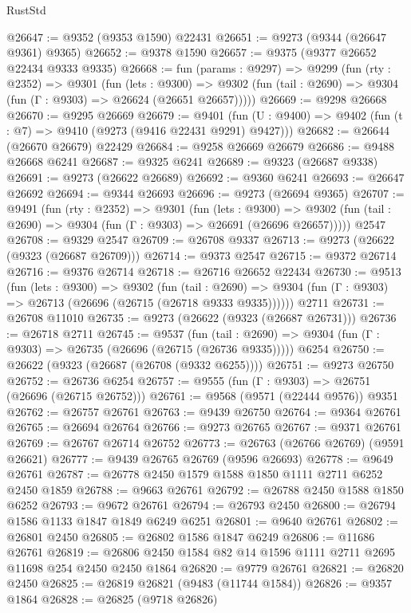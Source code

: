 \begin{lexlean}{RustStd}
\begin{coremodule}
{\begin{coremodule}
{{{{{{{{{{{{{{{{{{{{{{{{{{{{{{{{{{{{{{{{{{{{{{{{{{{{{{{@26647 := @9352 (@9353 @1590) @22431
@26651 := @9273 (@9344 (@26647 @9361) @9365)
@26652 := @9378 @1590
@26657 := @9375 (@9377 @26652 @22434 @9333 @9335)
@26668 := fun (params : @9297) =>
  @9299
    (fun (rty : @2352) =>
    @9301
      (fun (lets : @9300) =>
      @9302 (fun (tail : @2690) => @9304 (fun (Γ : @9303) => @26624 (@26651 @26657)))))
@26669 := @9298 @26668
@26670 := @9295 @26669
@26679 := @9401
    (fun (U : @9400) => @9402 (fun (t : @7) => @9410 (@9273 (@9416 @22431 @9291) @9427)))
@26682 := @26644 (@26670 @26679) @22429
@26684 := @9258 @26669 @26679
@26686 := @9488 @26668 @6241
@26687 := @9325 @6241
@26689 := @9323 (@26687 @9338)
@26691 := @9273 (@26622 @26689)
@26692 := @9360 @6241
@26693 := @26647 @26692
@26694 := @9344 @26693
@26696 := @9273 (@26694 @9365)
@26707 := @9491
    (fun (rty : @2352) =>
    @9301
      (fun (lets : @9300) =>
      @9302 (fun (tail : @2690) => @9304 (fun (Γ : @9303) => @26691 (@26696 @26657)))))
    @2547
@26708 := @9329 @2547
@26709 := @26708 @9337
@26713 := @9273 (@26622 (@9323 (@26687 @26709)))
@26714 := @9373 @2547
@26715 := @9372 @26714
@26716 := @9376 @26714
@26718 := @26716 @26652 @22434
@26730 := @9513
    (fun (lets : @9300) =>
    @9302
      (fun (tail : @2690) =>
      @9304 (fun (Γ : @9303) => @26713 (@26696 (@26715 (@26718 @9333 @9335))))))
    @2711
@26731 := @26708 @11010
@26735 := @9273 (@26622 (@9323 (@26687 @26731)))
@26736 := @26718 @2711
@26745 := @9537
    (fun (tail : @2690) => @9304 (fun (Γ : @9303) => @26735 (@26696 (@26715 (@26736 @9335)))))
    @6254
@26750 := @26622 (@9323 (@26687 (@26708 (@9332 @6255))))
@26751 := @9273 @26750
@26752 := @26736 @6254
@26757 := @9555 (fun (Γ : @9303) => @26751 (@26696 (@26715 @26752)))
@26761 := @9568 (@9571 (@22444 @9576)) @9351
@26762 := @26757 @26761
@26763 := @9439 @26750
@26764 := @9364 @26761
@26765 := @26694 @26764
@26766 := @9273 @26765
@26767 := @9371 @26761
@26769 := @26767 @26714 @26752
@26773 := @26763 (@26766 @26769) (@9591 @26621)
@26777 := @9439 @26765 @26769 (@9596 @26693)
@26778 := @9649 @26761
@26787 := @26778 @2450 @1579 @1588 @1850 @1111 @2711 @6252 @2450 @1859
@26788 := @9663 @26761
@26792 := @26788 @2450 @1588 @1850 @6252
@26793 := @9672 @26761
@26794 := @26793 @2450
@26800 := @26794 @1586 @1133 @1847 @1849 @6249 @6251
@26801 := @9640 @26761
@26802 := @26801 @2450
@26805 := @26802 @1586 @1847 @6249
@26806 := @11686 @26761
@26819 := @26806 @2450 @1584 @82 @14 @1596 @1111 @2711 @2695 @11698 @254 @2450 @2450 @1864
@26820 := @9779 @26761
@26821 := @26820 @2450
@26825 := @26819 @26821 (@9483 (@11744 @1584))
@26826 := @9357 @1864
@26828 := @26825 (@9718 @26826)
}}}}}}}}}}}}}}}}}}}}}}}}}}}}}}}}}}}}}}}}}}}}}}}}}}}}}}}
\end{coremodule}}
\end{coremodule}
\end{lexlean}
